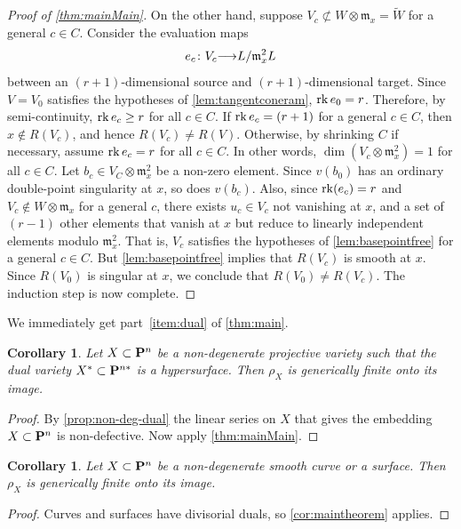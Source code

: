 \documentclass[11pt,reqno]{amsart}
\theoremstyle{plain}
\newtheorem{corollary}[theorem]{Corollary}
\theoremstyle{definition}
\theoremstyle{remark}
\numberwithin{equation}{section}
\renewcommand{\to}{{\longrightarrow}}
\numberwithin{equation}{section}
\begin{document}
\begin{proof}[Proof of \autoref{thm:mainMain}]
  On the other hand, suppose $V_c \not \subset W \otimes \mathfrak m_x = \widetilde W$ for a general $c \in C$.
  Consider the evaluation maps
  \[ e_c \from V_c \to L / \mathfrak m_x^2 L \]
  between an $(r+1)$-dimensional source and $(r+1)$-dimensional target.
  Since $V = V_0$ satisfies the hypotheses of \autoref{lem:tangentconeram}, $\rk e_0 = r$.
  Therefore, by semi-continuity, $\rk e_c \geq r$ for all $c \in C$.
  If $\rk e_c = (r+1)$ for a general $c \in C$, then $x \not \in R(V_c)$, and hence $R(V_c) \neq R(V)$.
  Otherwise, by shrinking $C$ if necessary, assume $\rk e_c = r$ for all $c \in C$.
  In other words, $\dim (V_c \otimes \mathfrak m_x^2) = 1$ for all $c \in C$.
  Let $b_c \in V_C \otimes \mathfrak m_x^2$ be a non-zero element.
  Since $v(b_0)$ has an ordinary double-point singularity at $x$, so does $v(b_c)$.
  Also, since $\rk (e_c) = r$ and $V_c \not \in W \otimes \mathfrak m_x$ for a general $c$, there exists $u_c \in V_c$ not vanishing at $x$, and a set of $(r-1)$ other elements that vanish at $x$ but reduce to linearly independent elements modulo $\mathfrak m_x^2$.
  That is, $V_c$ satisfies the hypotheses of \autoref{lem:basepointfree} for a general $c \in C$.
  But \autoref{lem:basepointfree} implies that $R(V_c)$ is smooth at $x$.
  Since $R(V_0)$ is singular at $x$, we conclude that $R(V_0) \neq R(V_c)$.
  The induction step is now complete.
\end{proof}

We immediately get part~\eqref{item:dual} of \autoref{thm:main}.
\begin{corollary}
  \label{cor:maintheorem} Let $X \subset \P^{n}$ be a non-degenerate projective variety such that the dual variety $X^{*} \subset \P^{n*}$ is a hypersurface. Then $\rho_{X}$ is generically finite onto its image.
\end{corollary}
\begin{proof}
  By \autoref{prop:non-deg-dual} the linear series on $X$ that gives the embedding $X \subset \P^n$ is non-defective.
  Now apply \autoref{thm:mainMain}.
\end{proof}

\begin{corollary}\label{cor:lowdim}
  Let $X \subset \P^n$ be a non-degenerate smooth curve or a surface.
  Then $\rho_X$ is generically finite onto its image.
\end{corollary}
\begin{proof}
  Curves and surfaces have divisorial duals, so \autoref{cor:maintheorem} applies.
\end{proof}
\end{document}
